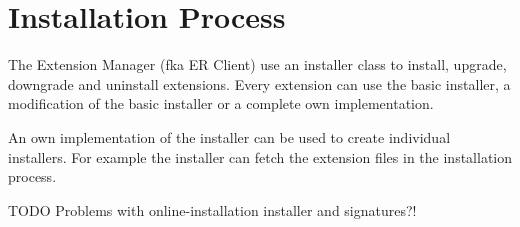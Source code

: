 \section[sec:installation process]{Installation Process}

The Extension Manager (fka ER Client) use an installer class to install, upgrade, downgrade and uninstall extensions.
Every extension can use the basic installer, a modification of the basic installer or a complete own implementation.

An own implementation of the installer can be used to create individual installers.
For example the installer can fetch the extension files in the installation process.

TODO Problems with online-installation installer and signatures?!
